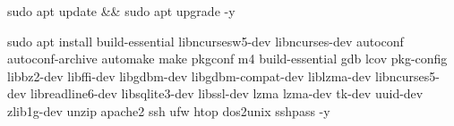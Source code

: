 
\begin{DoxyCode}
sudo apt update && sudo apt upgrade -y

sudo apt install build-essential libncursesw5-dev libncurses-dev autoconf autoconf-archive automake make
       pkgconf m4 build-essential gdb lcov pkg-config   libbz2-dev libffi-dev libgdbm-dev libgdbm-compat-dev
       liblzma-dev   libncurses5-dev libreadline6-dev libsqlite3-dev libssl-dev  lzma lzma-dev tk-dev uuid-dev zlib1g-dev
       unzip apache2 ssh ufw htop dos2unix sshpass -y
\end{DoxyCode}
 